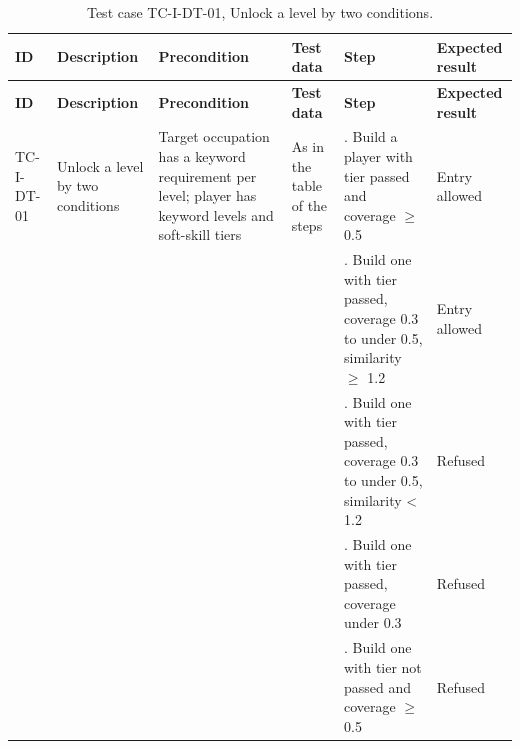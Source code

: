 {\footnotesize{}\renewcommand{\arraystretch}{1.1}
\begin{longtable}{|>{\raggedright\arraybackslash}p{}|>{\raggedright\arraybackslash}p{}|>{\raggedright\arraybackslash}p{}|>{\raggedright\arraybackslash}p{}|>{\raggedright\arraybackslash}p{}|>{\raggedright\arraybackslash}p{}|}
\caption{Test case TC-I-DT-01, Unlock a level by two conditions.} \\
\hline
\textbf{ID} & \textbf{Description} & \textbf{Precondition} & \textbf{Test data} & \textbf{Step} & \textbf{Expected result} \\ \hline
\endfirsthead
\hline
\textbf{ID} & \textbf{Description} & \textbf{Precondition} & \textbf{Test data} & \textbf{Step} & \textbf{Expected result} \\ \hline
\endhead
TC-I-DT-01 & Unlock a level by two conditions & Target occupation has a keyword requirement per level; player has keyword levels and soft-skill tiers & As in the table of the steps & 1. Build a player with tier passed and coverage $\geq$ 0.5 & Entry allowed \\ \cline{5-6}
 &  &  &  & 2. Build one with tier passed, coverage 0.3 to under 0.5, similarity $\geq$ 1.2 & Entry allowed \\ \cline{5-6}
 &  &  &  & 3. Build one with tier passed, coverage 0.3 to under 0.5, similarity < 1.2 & Refused \\ \cline{5-6}
 &  &  &  & 4. Build one with tier passed, coverage under 0.3 & Refused \\ \cline{5-6}
 &  &  &  & 5. Build one with tier not passed and coverage $\geq$ 0.5 & Refused \\ \hline
\end{longtable}
}

